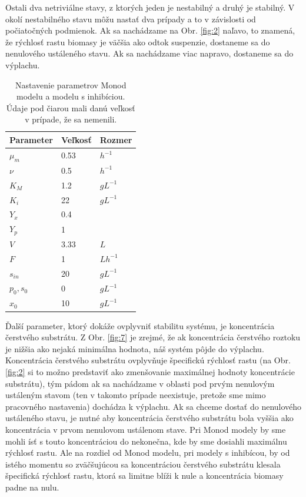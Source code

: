 \noindent Ostali dva netriviálne stavy, z ktorých jeden je nestabilný a druhý je stabilný. V okolí nestabilného stavu môžu nastať dva prípady a to v závislosti od počiatočných podmienok. Ak sa nachádzame na Obr. \ref{fig:2} naľavo, to znamená, že rýchlosť rastu biomasy je väčšia ako odtok suspenzie, dostaneme sa do nenulového ustáleného stavu. Ak sa nachádzame viac napravo, dostaneme sa do výplachu.

\begin{table}[H]
	\centering
	\caption{Nastavenie parametrov Monod modelu a modelu s inhibíciou. Údaje pod čiarou mali danú veľkosť v prípade, že sa nemenili.}
	\label{tab: 3}
	\begin{tabular}{lll}
		\hline
		\textbf{Parameter} & \textbf{Veľkosť} & \textbf{Rozmer} \\
		\hline
	 	$\mu_{m}$ & 0.53 & $h^{-1}$ \\
	 	$\nu$ & 0.5 & $h^{-1}$ \\
		$K_{M}$ & 1.2 & $gL^{-1}$ \\
		$K_{i}$ & 22 & $gL^{-1}$ \\
		$Y_{x}$ & 0.4 & \\
		$Y_{p}$ & 1 & \\
		$V$ & 3.33 & $L$ \\
		$F$ & 1 & $Lh^{-1}$ \\
		\hline
		$s_{in}$ & 20 & $gL^{-1}$ \\
		$p_0, s_0$ & 0 & $gL^{-1}$ \\
		$x_0$ & 10 & $gL^{-1}$ \\
		\hline
	\end{tabular}
\end{table}

Ďalší parameter, ktorý dokáže ovplyvniť stabilitu systému, je koncentrácia čerstvého substrátu. Z Obr. \ref{fig:7} je zrejmé, že ak koncentrácia čerstvého roztoku je nižšia ako nejaká minimálna hodnota, náš systém pôjde do výplachu. Koncentrácia čerstvého substrátu ovplyvňuje špecifickú rýchlosť rastu (na Obr. \ref{fig:2} si to možno predstaviť ako zmenšovanie maximálnej hodnoty koncentrácie substrátu), tým pádom ak sa nachádzame v oblasti pod prvým nenulovým ustáleným stavom (ten v takomto prípade neexistuje, pretože sme mimo pracovného nastavenia) dochádza k výplachu. Ak sa chceme dostať do nenulového ustáleného stavu, je nutné aby koncentrácia čerstvého substrátu bola vyššia ako koncentrácia v prvom nenulovom ustálenom stave. Pri Monod modely by sme mohli ísť s touto koncentráciou do nekonečna, kde by sme dosiahli maximálnu rýchlosť rastu. Ale na rozdiel od Monod modelu, pri modely s inhibícou, by od istého momentu so zväčšujúcou sa koncentráciou čerstvého substrátu klesala špecifická rýchlosť rastu, ktorá sa limitne blíži k nule a koncentrácia biomasy padne na nulu.

